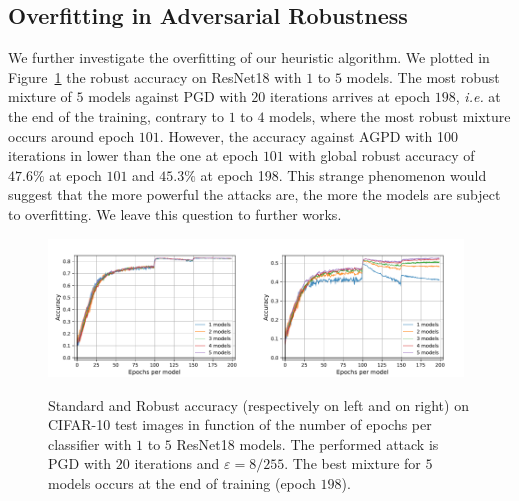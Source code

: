 \subsection{Overfitting in Adversarial Robustness}
We further investigate the overfitting of our heuristic algorithm. We plotted in Figure~\ref{fig:overfitting} the robust accuracy on ResNet18 with $1$ to $5$ models. The most robust mixture of $5$ models against PGD with $20$ iterations arrives at epoch $198$, \emph{i.e.} at the end of the training, contrary to $1$ to $4$ models, where the most robust mixture occurs around epoch $101$. However, the accuracy against AGPD with 100 iterations in lower than the one at epoch $101$ with global robust accuracy of $47.6\%$ at epoch $101$ and $45.3\%$ at epoch 198. This strange phenomenon would suggest that the more powerful the attacks are, the more the models are subject to overfitting. We leave this question to further works.


\begin{figure}[!ht]
\begin{center}
\includegraphics[width=0.49\textwidth]{Images/5_standard_acc_finalrun_ResNet18_1024_200_0.001.pdf}\includegraphics[width=0.49\textwidth]{Images/5_robust_acc_finalrun_ResNet18_1024_200_0.001.pdf} 

\caption{Standard and Robust accuracy (respectively on  left and on right) on CIFAR-10 test images in function of the number of epochs per classifier with $1$ to $5$ ResNet18 models. The performed attack is PGD with $20$ iterations and $\varepsilon=8/255$. The best mixture for $5$ models occurs at the end of training (epoch $198$).}
\label{fig:overfitting}
\end{center}
\end{figure}



